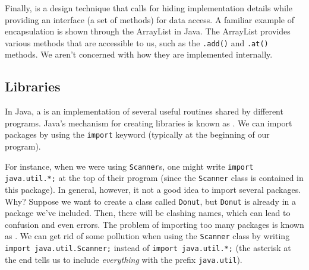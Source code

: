 Finally,  is a design technique that calls for hiding implementation details while providing an interface (a set of methods) for data access. A familiar example of encapsulation is shown through the ArrayList in Java. The ArrayList provides various methods that are accessible to us, such as the \verb!.add()! and \verb!.at()! methods. We aren't concerned with how they are implemented internally.


\subsection{Libraries}

In Java, a  is an implementation of several useful routines shared by different programs. Java's mechanism for creating libraries is known as . We can import packages by using the \verb!import! keyword (typically at the beginning of our program). 

For instance, when we were using \verb!Scanner!s, one might write \verb!import java.util.*;! at the top of their program (since the \verb!Scanner! class is contained in this package). In general, however, it not a good idea to import several packages. Why? Suppose we want to create a class called \verb!Donut!, but \verb!Donut! is already in a package we've included. Then, there will be clashing names, which can lead to confusion and even errors. The problem of importing too many packages is known as . We can get rid of some pollution when using the \verb!Scanner! class by writing \verb!import java.util.Scanner;! instead of \verb!import java.util.*;! (the asterisk at the end tells us to include \textit{everything} with the prefix \verb!java.util!). \\